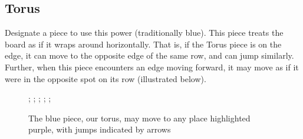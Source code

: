 \documentclass{article}
\begin{document}
\subsection*{Torus}
Designate a piece to use this power (traditionally blue).
This piece treats the board as if it wraps around horizontally.
That is, if the Torus piece is on the edge, it can move to the opposite edge of the same row, and can jump similarly.
Further, when this piece encounters an edge moving forward, it may move as if it were in the opposite spot on its row (illustrated below).

\begin{figure}[h]
  \begin{struggleboard}{0.75}
    ;
    ;
    ;
    ;
    ;
  \end{struggleboard}
  \caption{The blue piece, our torus, may move to any place highlighted purple, with jumps indicated by arrows}
\end{figure}
\end{document}
